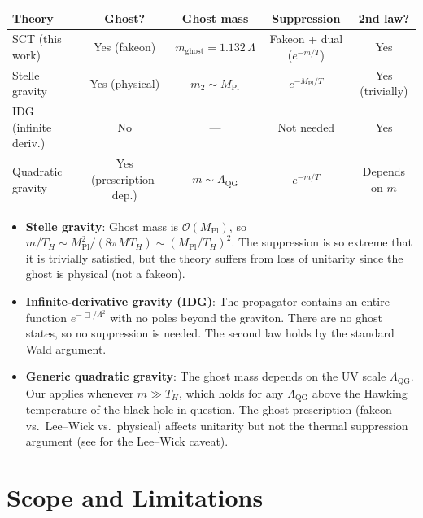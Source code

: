 \documentclass[11pt,a4paper]{article}
\newcommand{\order}{\mathcal{O}}
\newcommand{\MPl}{M_{\mathrm{Pl}}}
\newcommand{\mghost}{m_{\mathrm{ghost}}}
\newcommand{\Thr}{T_{\!\scriptscriptstyle H}}
\theoremstyle{plain}
\theoremstyle{definition}
\begin{document}
\begin{center}
\small
\begin{tabular}{@{}lcccc@{}}
\toprule
\textbf{Theory} & \textbf{Ghost?} & \textbf{Ghost mass}
  & \textbf{Suppression} & \textbf{2nd law?} \\
\midrule
SCT (this work)
  & Yes (fakeon) & $\mghost = 1.132\,\Lambda$
  & Fakeon + dual ($e^{-m/T}$) & Yes \\[2pt]
Stelle gravity
  & Yes (physical) & $m_2 \sim \MPl$
  & $e^{-\MPl/T}$ & Yes (trivially) \\[2pt]
IDG (infinite deriv.)
  & No & --- & Not needed & Yes \\[2pt]
Quadratic gravity
  & Yes (prescription-dep.) & $m \sim \Lambda_{\mathrm{QG}}$
  & $e^{-m/T}$ & Depends on $m$ \\
\bottomrule
\end{tabular}
\end{center}

\begin{itemize}[leftmargin=1.5em]
  \item \textbf{Stelle gravity}: Ghost mass is $\order(\MPl)$, so
    $m/\Thr \sim \MPl^2/(8\pi M\Thr) \sim (\MPl/\Thr)^2$.  The
    suppression is so extreme that it is trivially satisfied, but the
    theory suffers from loss of unitarity since the ghost is physical
    (not a fakeon).

  \item \textbf{Infinite-derivative gravity (IDG)}: The propagator
    contains an entire function $e^{-\Box/\Lambda^2}$ with no poles
    beyond the graviton.  There are no ghost states, so no suppression
    is needed.  The second law holds by the standard Wald argument.

  \item \textbf{Generic quadratic gravity}: The ghost mass depends on
    the UV scale $\Lambda_{\mathrm{QG}}$.  Our 
    applies whenever $m \gg \Thr$, which holds for any $\Lambda_{\mathrm{QG}}$
    above the Hawking temperature of the black hole in question.  The
    ghost prescription (fakeon vs.\ Lee--Wick vs.\ physical) affects
    unitarity but not the thermal suppression argument (see
     for the Lee--Wick caveat).
\end{itemize}


\section{Scope and Limitations}\label{sec:scope}
\end{document}
